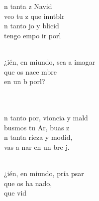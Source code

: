 \documentclass[12pt]{article}
\begin{document}
\begin{multicols*}{2}
\begin{cancion}%
	n tanta z  Navid\\
	 veo tu z que inntblr \\
	n tanto jo y blicid\\
	 tengo empo  ir  porl \\\jump\\
	\begin{chorus}%
	¿ién, en miundo, sea a imagar \\
	que os nace mbre\\
	en un b porl?  \\
	\end{chorus}%
	\jump\\
	  \\
	n tanto por, vioncia y mald\\
	busmos tu Ar, buas  z \\
	n tanta rieza y modid,\\
	 vas a nar en un bre j. \\\jump\\
	\begin{chorus}%
	¿ién, en miundo, pría psar \\
	que os ha nado,\\
	que  vid \\
	\end{chorus}%
	\jump\\

\end{cancion}
\end{multicols*}
\end{document}

